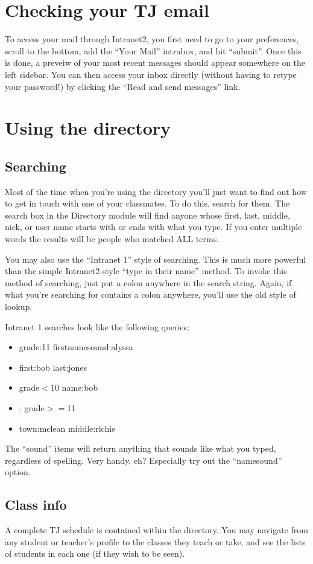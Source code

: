 \documentclass[11pt,letterpaper]{report}
\begin{document}
\section{Checking your TJ email}
To access your mail through Intranet2, you first need to go to your preferences, scroll to the bottom, add the ``Your Mail''
intrabox, and hit ``submit''. Once this is done, a preveiw of your most recent messages should appear somewhere on the left sidebar.
You can then access your inbox directly (without having to retype your password!) by clicking the ``Read and send messages'' link.
\section{Using the directory}
\subsection{Searching}
Most of the time when you're using the directory you'll just want to find out 
how to get in touch with one of your classmates.  To do this, search for them.
The search box in the Directory module will find anyone whose first, last, middle,
nick, or user name starts with or ends with what you type.  If you enter multiple
words the results will be people who matched ALL terms.

You may also use the ``Intranet 1'' style of searching.  This is much more powerful
than the simple Intranet2-style ``type in their name'' method.  To invoke this method
of searching, just put a colon anywhere in the search string.  Again, if what you're
searching for contains a colon anywhere, you'll use the old style of lookup.

Intranet 1 searches look like the following queries:
\begin{itemize}
	\item grade:11 firstnamesound:alyssa
	\item first:bob last:jones
	\item grade$<$10 name:bob
	\item : grade$>=$11
	\item town:mclean middle:richie
\end{itemize}
The ``sound'' items will return anything that sounds like what you typed, 
regardless of spelling.  Very handy, eh? Especially try out the ``namesound'' 
option.
\subsection{Class info}
A complete TJ schedule is contained within the directory.  You may navigate
from any student or teacher's profile to the classes they teach or take,
and see the lists of students in each one (if they wish to be seen).
\end{document}
